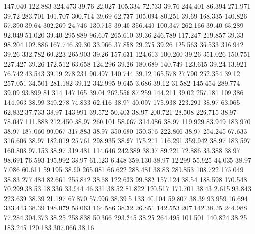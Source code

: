  147.040  122.883  324.473        39.76
  22.027  105.334   72.733        39.76
 244.401   86.394  271.971        39.72
 283.701  101.707  300.714        39.69
  62.737  105.094   80.251        39.69
 168.335  140.826   57.390        39.64
 302.269   24.746  130.715        39.40
 356.440  100.347  262.166        39.40
  65.289   92.049   51.020        39.40
 295.889   96.607  265.610        39.36
 246.789  117.247  219.857        39.33
  98.204  102.886  167.746        39.30
  33.066   37.858   29.275        39.26
 125.563   36.533  316.942        39.26
 332.782   60.223  265.903        39.26
 157.631  124.613  100.260        39.26
 351.026  150.751  227.427        39.26
 172.512   63.658  124.296        39.26
 180.689  140.749  123.615        39.24
  13.921   76.742   43.543        39.19
 278.231   90.497  140.744        39.12
 165.578   27.790  252.354        39.12
 257.051   34.501  281.182        39.12
 342.995    9.645    3.686        39.12
  31.582  145.454  289.774        39.09
  93.899   81.314  147.165        39.04
 262.556   87.259  144.211        39.02
 257.181  109.386  144.963        38.99
 349.278   74.833   62.416        38.97
  40.097  175.938  223.291        38.97
  63.065   62.832   37.733        38.97
 143.991   39.572   50.403        38.97
 200.721   28.508  226.715        38.97
  78.047  111.888  212.450        38.97
 260.101   58.067  314.086        38.97
 119.929   83.949  183.970        38.97
 187.060   90.067  317.883        38.97
 350.690  150.576  222.866        38.97
 254.245   67.633  316.606        38.97
 182.019   25.761  298.935        38.97
 175.271  116.291  359.942        38.97
 183.597  160.808   97.153        38.97
 319.481  114.646  242.389        38.97
  89.221   72.886   33.388        38.97
  98.691   76.593  195.992        38.97
  61.123    6.448  359.130        38.97
  12.299   55.925   44.035        38.97
   7.086   60.611   59.195        38.90
 265.081   66.622  288.481        38.83
 280.853  108.722  175.049        38.83
 277.484   82.661  255.842        38.68
 122.633   99.882  157.124        38.54
 188.598  170.548   70.299        38.53
  18.336   33.944   46.331        38.52
  81.822  120.517  170.701        38.43
   2.615   93.843  223.639        38.39
  21.197   67.870   57.996        38.39
   5.133   40.104   59.807        38.39
  93.959   16.694  333.443        38.39
 198.079   58.063  164.586        38.32
  26.851  142.553  207.142        38.25
 244.988   77.284  304.373        38.25
 258.838   50.366  293.245        38.25
 264.495  101.501  140.824        38.25
 183.245  120.183  307.066        38.16
